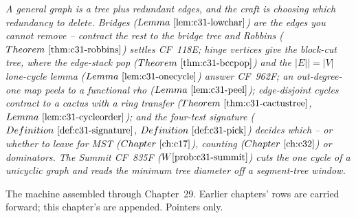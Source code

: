 \begin{recallbox}
\emph{A general graph is a tree plus redundant edges, and the craft is choosing
which redundancy to delete.  Bridges (\(\lemref{c31-lowchar}\)) are the edges you
cannot remove -- contract the rest to the bridge tree and Robbins
(\(\thmref{c31-robbins}\)) settles CF~118E; hinge vertices give the block-cut tree,
where the edge-stack pop (\(\thmref{c31-bccpop}\)) and the \(|E|{|}{=}|V|\) lone-cycle
lemma (\(\lemref{c31-onecycle}\)) answer CF~962F; an out-degree-one map peels to a
functional rho (\(\lemref{c31-peel}\)); edge-disjoint cycles contract to a cactus with
a ring transfer (\(\thmref{c31-cactustree}\), \(\lemref{c31-cycleorder}\)); and the four-test
signature (\(\defref{c31-signature}\), \(\defref{c31-pick}\)) decides which -- or whether to
leave for MST (\(\chref{c17}\)), counting (\(\chref{c32}\)) or dominators.  The Summit
CF~835F (\(\probref{c31-summit}\)) cuts the one cycle of a unicyclic graph and reads
the minimum tree diameter off a segment-tree window.}
\end{recallbox}


The machine assembled through Chapter~29.  Earlier chapters' rows are carried
forward; this chapter's are appended.  Pointers only.

